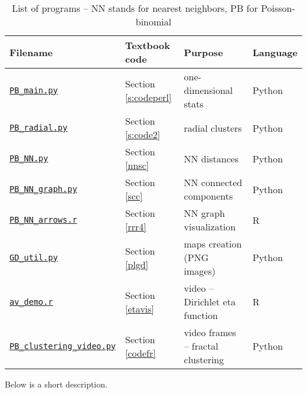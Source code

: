\documentclass[10pt]{article}
\begin{document}
\begin{table}[H]
\begin{center}
\begin{tabular}{|l|l|l|l|}
\hline
  Filename & Textbook code & Purpose  & Language \\ %
\hline
  \href{https://github.com/VincentGranville/Point-Processes/blob/main/Source\%20Code/PB_main.py}{\texttt{PB\_main.py}} & Section \ref{s:codeperl} & one-dimensional stats &  Python \\

 \href{https://github.com/VincentGranville/Point-Processes/blob/main/Source\%20Code/PB_radial.py}{\texttt{PB\_radial.py}} & Section \ref{s:code2} & radial clusters &  Python \\

 \href{https://github.com/VincentGranville/Point-Processes/blob/main/Source\%20Code/PB_NN.py}{\texttt{PB\_NN.py}} & Section \ref{nnsc} & NN distances &  Python \\

\href{https://github.com/VincentGranville/Point-Processes/blob/main/Source\%20Code/PB_NN_graph.py}{\texttt{PB\_NN\_graph.py}} &  Section \ref{scc} & NN connected components &  Python \\

\href{https://github.com/VincentGranville/Point-Processes/blob/main/Source\%20Code/PP_NN_arrows.r}{\texttt{PB\_NN\_arrows.r}}  &  Section \ref{rrr4} & NN graph visualization &    R \\

 \href{https://github.com/VincentGranville/Point-Processes/blob/main/Source\%20Code/GD_util.py}{\texttt{GD\_util.py}} &  Section \ref{plgd} & maps creation (PNG images) &  Python \\

 \href{https://github.com/VincentGranville/Point-Processes/blob/main/Videos/av_demo.r}{\texttt{av\_demo.r}} &  Section \ref{etavis} & video -- Dirichlet eta function &  R \\


 \href{https://github.com/VincentGranville/Point-Processes/blob/main/Videos/PB_clustering_video.py}{\texttt{PB\_clustering\_video.py}} &  Section \ref{codefr} & video frames -- fractal clustering &  Python \\
\hline


\end{tabular}
\caption{\label{tabpgr}List of programs -- NN stands for nearest neighbors, PB for Poisson-binomial}
\end{center}
\end{table}
\noindent Below is a short description.
\end{document}

